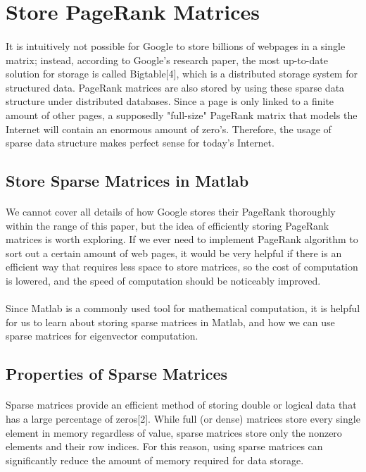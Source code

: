 \documentclass[12pt]{article}
\begin{document}
\section{Store PageRank Matrices}
\paragraph{} It is intuitively not possible for Google to store billions of webpages in a single matrix; instead, according to Google's research paper, the most up-to-date solution for storage is called Bigtable[4], which is a distributed storage system for structured data. PageRank matrices are also stored by using these sparse data structure under distributed databases. Since a page is only linked to a finite amount of other pages, a supposedly "full-size" PageRank matrix that models the Internet will contain an enormous amount of zero's. Therefore, the usage of sparse data structure makes perfect sense for today's Internet.


\subsection{Store Sparse Matrices in Matlab}
\paragraph{} We cannot cover all details of how Google stores their PageRank thoroughly within the range of this paper, but the idea of efficiently storing PageRank matrices is worth exploring. If we ever need to implement PageRank algorithm to sort out a certain amount of web pages, it would be very helpful if there is an efficient way that requires less space to store matrices, so the cost of computation is lowered, and the speed of computation should be noticeably improved.

\paragraph{} Since Matlab is a commonly used tool for mathematical computation, it is helpful for us to learn about storing sparse matrices in Matlab, and how we can use sparse matrices for eigenvector computation.

\subsection{Properties of Sparse Matrices}
\paragraph{} Sparse matrices provide an efficient method of storing double or logical data that has a large percentage of zeros[2]. While full (or dense) matrices store every single element in memory regardless of value, sparse matrices store only the nonzero elements and their row indices. For this reason, using sparse matrices can significantly reduce the amount of memory required for data storage.
\end{document}
